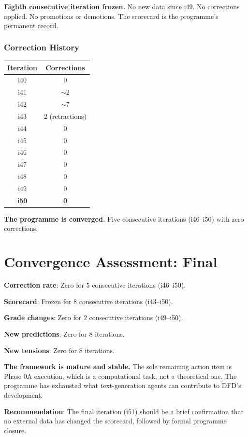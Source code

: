 \documentclass[11pt,a4paper]{article}
\begin{document}
\textbf{Eighth consecutive iteration frozen.} No new data since i49. No corrections applied. No promotions or demotions. The scorecard is the programme's permanent record.

\section{Correction History}

\begin{center}
\begin{tabular}{cc}
\toprule
\textbf{Iteration} & \textbf{Corrections} \\
\midrule
i40 & 0 \\
i41 & $\sim$2 \\
i42 & $\sim$7 \\
i43 & 2 (retractions) \\
i44 & 0 \\
i45 & 0 \\
i46 & 0 \\
i47 & 0 \\
i48 & 0 \\
i49 & 0 \\
\textbf{i50} & \textbf{0} \\
\bottomrule
\end{tabular}
\end{center}

\textbf{The programme is converged.} Five consecutive iterations (i46--i50) with zero corrections.


\part{Convergence Assessment: Final}
\label{part:convergence}

\begin{tcolorbox}[colback=green!5!white, colframe=green!60!black,
  title={Programme Status: CONVERGED}]

\textbf{Correction rate}: Zero for 5 consecutive iterations (i46--i50).

\textbf{Scorecard}: Frozen for 8 consecutive iterations (i43--i50).

\textbf{Grade changes}: Zero for 2 consecutive iterations (i49--i50).

\textbf{New predictions}: Zero for 8 iterations.

\textbf{New tensions}: Zero for 8 iterations.

\textbf{The framework is mature and stable.} The sole remaining action item is Phase 0A execution, which is a computational task, not a theoretical one. The programme has exhausted what text-generation agents can contribute to DFD's development.

\textbf{Recommendation}: The final iteration (i51) should be a brief confirmation that no external data has changed the scorecard, followed by formal programme closure.
\end{tcolorbox}
\end{document}
